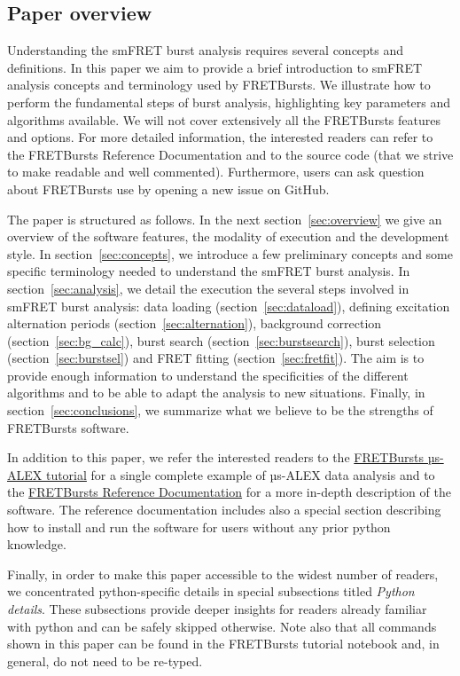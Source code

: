 \subsection{Paper overview}

Understanding the smFRET burst analysis requires several concepts and definitions.
In this paper we aim to provide a brief introduction to smFRET analysis concepts
and terminology used by FRETBursts. We illustrate how to perform
the fundamental steps of burst analysis, highlighting key parameters
and algorithms available. We will not cover extensively all the FRETBursts
features and options. For more detailed information, the interested readers can refer
to the FRETBursts Reference Documentation and to the source code (that we strive
to make readable and well commented).
Furthermore, users can ask question about FRETBursts use by opening 
a new issue on GitHub.

The paper is structured as follows.
In the next section~\ref{sec:overview} we give an overview of the software features,
the modality of execution and the development style.
In section~\ref{sec:concepts}, we
introduce a few preliminary concepts and some specific terminology needed
to understand the smFRET burst analysis.
In section~\ref{sec:analysis}, we detail the execution the several steps involved
in smFRET burst analysis: data loading (section~\ref{sec:dataload}), defining
excitation alternation periods (section~\ref{sec:alternation}), background
correction (section~\ref{sec:bg_calc}), burst search (section~\ref{sec:burstsearch}),
burst selection (section~\ref{sec:burstsel}) and FRET fitting (section~\ref{sec:fretfit}).
The aim is to provide enough information to understand the specificities of
the different algorithms and to be able to adapt the analysis to new situations.
Finally, in section~\ref{sec:conclusions}, we summarize what we believe to be
the strengths of FRETBursts software.

In addition to this paper, we refer the interested readers to the
\href{http://nbviewer.ipython.org/github/tritemio/FRETBursts_notebooks/blob/master/notebooks/FRETBursts\%20-\%20us-ALEX\%20smFRET\%20burst\%20analysis.ipynb}{FRETBursts µs-ALEX tutorial}
for a single complete example of µs-ALEX data analysis and to the
\href{http://fretbursts.readthedocs.org/}{FRETBursts Reference Documentation}
for a more in-depth description of the software. The reference documentation
includes also a special section describing how to install and run the software
for users without any prior python knowledge.

Finally, in order to make this paper accessible to the widest number of readers,
we concentrated python-specific details in special subsections titled
\textit{Python details}. These subsections provide deeper insights for readers
already familiar with python and can be safely skipped otherwise. Note also
that all commands shown in this paper can be found in the FRETBursts tutorial notebook
and, in general, do not need to be re-typed.


